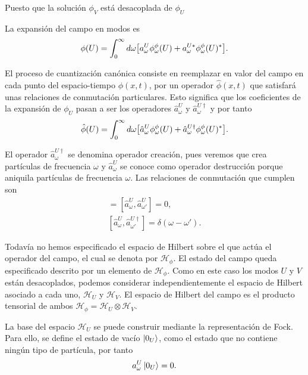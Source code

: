Puesto que la solución $\phi_V$ está desacoplada de $\phi_U$

La expansión del campo en modos es
\begin{equation}
\phi(U) = \int_0^\infty d\omega \qty[a_\omega^U \phi_\omega^\phi (U)+a_\omega^{U*} \phi_\omega^\phi (U)^*].
\end{equation}

El proceso de cuantización canónica consiste en reemplazar en valor del campo en cada
punto del espacio-tiempo $\phi(x,t)$, por un operador $\hat \phi(x,t)$ que satisfará unas
relaciones de conmutación particulares. 
Esto significa que los coeficientes de la expansión de $\phi_U$ pasan a ser los operadores
$\hat a_\omega^U$ y $\hat a_\omega^{U\dagger}$ y por tanto
\begin{equation}
  \hat \phi(U) = \int_0^\infty d\omega \qty[\hat a_\omega^U\phi_\omega^\phi (U)+\hat a_\omega^{U\dagger} \phi_\omega^\phi (U)^*].
\end{equation}

El operador $\hat a_\omega^{U\dagger}$ se denomina operador creación, pues veremos que crea 
partículas de frecuencia $\omega$ y $\hat a_\omega^U$ se conoce como operador destrucción porque
aniquila partículas de frecuencia $\omega$.
Las relaciones de conmutación que cumplen son
\begin{gather}
  [\hat a_\omega^{U\dagger},\hat a_{\omega'}^{U\dagger}]=[\hat a_\omega^U,\hat a_{\omega'}^U]=0, \\
  [\hat a_\omega^U,\hat a_{\omega'}^{U\dagger}]=\delta(\omega-\omega').
\end{gather}

Todavía no hemos especificado el espacio de Hilbert sobre el que actúa el operador del campo, el cual
se denota por $\mathcal H_\phi$. 
El estado del campo queda especificado descrito por un elemento de $\mathcal H_\phi$.
Como en este caso los modos $U$ y $V$ están desacoplados, podemos considerar independientemente el espacio
de Hilbert asociado a cada uno, $\mathcal H_U$ y $\mathcal H_V$.
El espacio de Hilbert del campo es el producto tensorial de ambos $\mathcal H_\phi=\mathcal H_U\otimes \mathcal H_V$.

La base del espacio $\mathcal H_U$ se puede construir mediante la representación de Fock. 
Para ello, se define el estado de vacío $\ket{0_U}$, como el estado que no contiene ningún tipo
de partícula, por tanto
\begin{equation}
  a^U_\omega \ket{0_U} = 0.
\end{equation}

